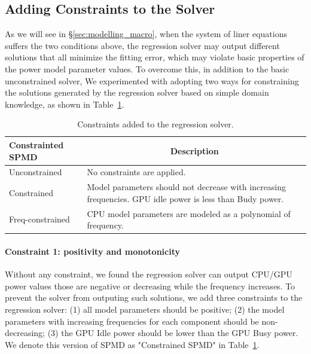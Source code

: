 \subsection{Adding Constraints to the Solver}
\label{subsec:constraint}

As we will see in \S\ref{sec:modelling_macro}, 
when the system of liner equations suffers the two conditions above, the regression solver may output different solutions that all minimize the fitting error, which may violate basic properties of the power model parameter values. To overcome this, in addition to the basic unconstrained solver, 
\fi 
We experimented with adopting two ways for constraining the solutions generated by the regression solver based on simple domain knowledge, as shown in Table~\ref{tab:constrained}.

\begin{table}[tp]
{\small
    \centering
    \caption{Constraints added to the regression solver.}
    \vspace{-0.1in}
    \begin{tabular}{|p{25mm}|p{52mm}|}
    \hline
         Constrainted SPMD  & \multicolumn{1}{c|}{Description} \\
         \hline
         Unconstrained      & No constraints are applied. \\
         Constrained        & Model parameters should not decrease with increasing frequencies. GPU idle power is less than Budy power. \\
         Freq-constrained   & CPU model parameters are modeled as a polynomial of frequency. \\
         \hline
    \end{tabular}
    \label{tab:constrained}
    \vspace{-0.1in}
}
\end{table}


\paragraph{Constraint 1: positivity and monotonicity}
Without any constraint, we found the regression solver can output CPU/GPU power values those are negative or 
decreasing while the frequency increases.
To prevent the solver from outputing such solutions, we add three constraints to the regression solver: 
(1) all model parameters should be positive;
(2) the model parameters with increasing frequencies for each component should be non-decreasing;
(3) the GPU Idle power should be lower than the GPU Busy power. 
We denote this version of SPMD as "Constrained SPMD" in Table~\ref{tab:constrained}.


